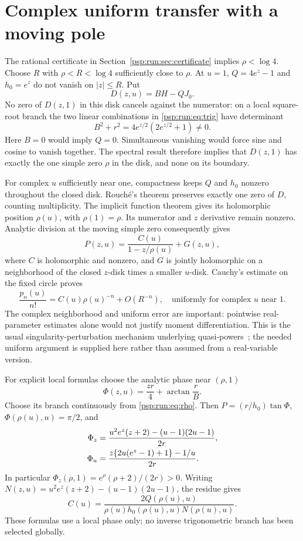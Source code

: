 \documentclass[11pt,letterpaper]{article}
\numberwithin{equation}{section}
\theoremstyle{remark}\newtheorem{remark}[theorem]{Remark}
\begin{document}
\section{Complex uniform transfer with a moving pole}\label{psp:run:sec:transfer}
The rational certificate in Section~\ref{psp:run:sec:certificate} implies
$\rho<\log4$. Choose $R$ with $\rho<R<\log4$ sufficiently close to
$\rho$. At $u=1$, $Q=4e^z-1$ and $h_0=e^z$ do not vanish on
$|z|\leq R$. Put
\[
 D(z,u)=BH-QJ_0.
\]
No zero of $D(z,1)$ in this disk cancels against the numerator: on a
local square-root branch the two linear combinations in
\eqref{psp:run:eq:trig} have determinant
\[
 B^2+r^2=4e^{z/2}(2e^{z/2}+1)\ne0.
\]
Here $B=0$ would imply $Q=0$. Simultaneous vanishing would force sine
and cosine to vanish together. The spectral result therefore implies
that $D(z,1)$ has exactly the one simple zero $\rho$ in the disk, and
none on its boundary.

For complex $u$ sufficiently near one, compactness keeps $Q$ and $h_0$
nonzero throughout the closed disk. Rouch\'e's theorem preserves exactly
one zero of $D$, counting multiplicity. The implicit function theorem
gives its holomorphic position $\rho(u)$, with $\rho(1)=\rho$. Its
numerator and $z$ derivative remain nonzero. Analytic division at the
moving simple zero consequently gives
\begin{equation}\label{psp:run:eq:decomposition}
 P(z,u)=\frac{C(u)}{1-z/\rho(u)}+G(z,u),
\end{equation}
where $C$ is holomorphic and nonzero, and $G$ is jointly holomorphic on
a neighborhood of the closed $z$-disk times a smaller $u$-disk.
Cauchy's estimate on the fixed circle proves
\begin{equation}\label{psp:run:eq:uniform}
 \frac{p_n(u)}{n!}=C(u)\rho(u)^{-n}+O(R^{-n}),
 \quad\text{uniformly for complex $u$ near 1}.
\end{equation}
The complex neighborhood and uniform error are important: pointwise
real-parameter estimates alone would not justify moment differentiation.
This is the usual singularity-perturbation mechanism underlying
quasi-powers~\cite[Chapter IX]{fs}; the needed uniform argument is supplied
here rather than assumed from a real-variable version.

For explicit local formulas choose the analytic phase near $(\rho,1)$
\[
 \Phi(z,u)=\frac{zr}4+\arctan\frac rB.
\]
Choose its branch continuously from \eqref{psp:run:eq:rho}. Then
$P=(r/h_0)\tan\Phi$, $\Phi(\rho(u),u)=\pi/2$, and
\begin{align}
 \Phi_z&=\frac{u^2e^z(z+2)-(u-1)(2u-1)}{2r},\notag\\
 \Phi_u&=\frac{z\{2u(e^z-1)+1\}-1/u}{2r}.\label{psp:run:eq:phiderivatives}
\end{align}
In particular $\Phi_z(\rho,1)=e^\rho(\rho+2)/(2r)>0$.
Writing
$N(z,u)=u^2e^z(z+2)-(u-1)(2u-1)$, the residue gives
\begin{equation}\label{psp:run:eq:C}
 C(u)=\frac{2Q(\rho(u),u)}
 {\rho(u)h_0(\rho(u),u)N(\rho(u),u)}.
\end{equation}
These formulas use a local phase only; no inverse trigonometric branch
has been selected globally.
\end{document}
